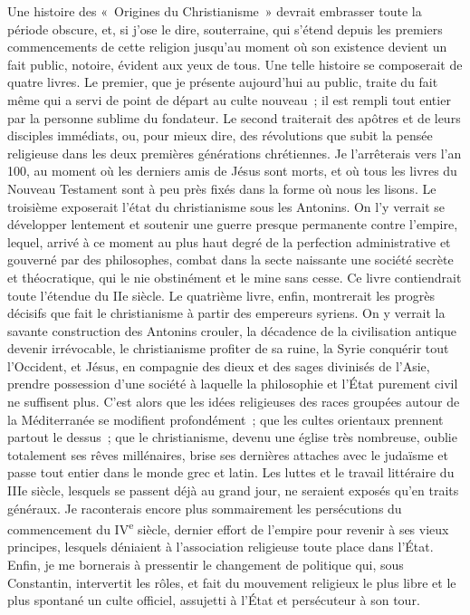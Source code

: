 \documentclass[french,twoside]{book} %
\newcommand\chaptercont{} %
\begin{document}
\chaptercont
\noindent Une histoire des « Origines du Christianisme » devrait embrasser toute la période obscure, et, si j’ose le dire, souterraine, qui s’étend depuis les premiers commencements de cette religion jusqu’au moment où son existence devient un fait public, notoire, évident aux yeux de tous. Une telle histoire se composerait de quatre livres. Le premier, que je présente aujourd’hui au public, traite du fait même qui a servi de point de départ au culte nouveau ; il est rempli tout entier par la personne sublime du fondateur. Le second traiterait des apôtres et de leurs disciples immédiats, ou, pour mieux dire, des révolutions que subit la pensée religieuse dans les deux premières générations chrétiennes. Je l’arrêterais vers l’an 100, au moment où les derniers amis de Jésus sont morts, et où tous les livres du Nouveau Testament sont à peu près fixés dans la forme où nous les lisons. Le troisième exposerait l’état du christianisme sous les Antonins. On l’y verrait se développer lentement et soutenir une guerre presque permanente contre l’empire, lequel, arrivé à ce moment au plus haut degré de la perfection administrative et gouverné par des philosophes, combat dans la secte naissante une société secrète et théocratique, qui le nie obstinément et le mine sans cesse. Ce livre contiendrait toute l’étendue du IIe siècle. Le quatrième livre, enfin, montrerait les progrès décisifs que fait le christianisme à partir des empereurs syriens. On y verrait la savante construction des Antonins crouler, la décadence de la civilisation antique devenir irrévocable, le christianisme profiter de sa ruine, la Syrie conquérir tout l’Occident, et Jésus, en compagnie des dieux et des sages divinisés de l’Asie, prendre possession d’une société à laquelle la philosophie et l’État purement civil ne suffisent plus. C’est alors que les idées religieuses des races groupées autour de la Méditerranée se modifient profondément ; que les cultes orientaux prennent partout le dessus ; que le christianisme, devenu une église très nombreuse, oublie totalement ses rêves millénaires, brise ses dernières attaches avec le judaïsme et passe tout entier dans le monde grec et latin. Les luttes et le travail littéraire du IIIe siècle, lesquels se passent déjà au grand jour, ne seraient exposés qu’en traits généraux. Je raconterais encore plus sommairement les persécutions du commencement du IV\textsuperscript{e} siècle, dernier effort de l’empire pour revenir à ses vieux principes, lesquels déniaient à l’association religieuse toute place dans l’État. Enfin, je me bornerais à pressentir le changement de politique qui, sous Constantin, intervertit les rôles, et fait du mouvement religieux le plus libre et le plus spontané un culte officiel, assujetti à l’État et persécuteur à son tour.\par
\end{document}
